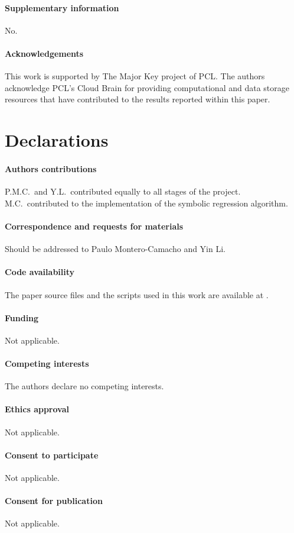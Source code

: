 \paragraph{\large Supplementary information} No.

\paragraph{\large Acknowledgements}
This work is supported by The Major Key project of PCL.
The authors acknowledge PCL's Cloud Brain for providing computational
and data storage resources that have contributed to the results reported
within this paper.

\section*{Declarations}

\paragraph{\large Authors contributions}
P.M.C.\ and Y.L.\ contributed equally to all stages of the project.
M.C.\ contributed to the implementation of the symbolic regression
algorithm.

\vspace{-1em}
\paragraph{\large Correspondence and requests for materials}
Should be addressed to Paulo Montero-Camacho and Yin Li.

\vspace{-1em}
\paragraph{\large Code availability}
The paper source files and the scripts used in this work are available
at \href{https://github.com/eelregit/5par}{\faGithub}.

\vspace{-1em}
\paragraph{\large Funding}
Not applicable.

\vspace{-1em}
\paragraph{\large Competing interests}
The authors declare no competing interests.

\vspace{-1em}
\paragraph{\large Ethics approval}
Not applicable.

\vspace{-1em}
\paragraph{\large Consent to participate}
Not applicable.

\vspace{-1em}
\paragraph{\large Consent for publication}
Not applicable.
